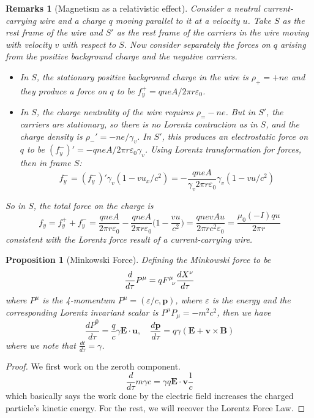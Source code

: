 \documentclass[a4paper]{article}
\newtheorem{remarks}{Remarks}[section]
\theoremstyle{new}
\newtheorem{prop}{Proposition}[section]
\begin{document}
\begin{remarks}[Magnetism as a relativistic effect]
Consider a neutral current-carrying wire and a charge $q$ moving parallel to it at a velocity $u$. Take $S$ as the rest frame of the wire and $S'$ as the rest frame of the carriers in the wire moving with velocity $v$ with respect to $S$. Now consider separately the forces on $q$ arising from the positive background charge and the negative carriers.
\begin{itemize}
    \item In $S$, the stationary positive background charge in the wire is $\rho_+=+ne$ and they produce a force on $q$ to be $f_y^+=qneA/2\pi r\varepsilon_0$.
    \item In $S$, the charge neutrality of the wire requires $\rho_=-ne$. But in $S'$, the carriers are stationary, so there is no Lorentz contraction as in $S$, and the charge density is $\rho_-'=-ne/\gamma_v$. In $S'$, this produces an electrostatic force on $q$ to be $(f_y^-)'=-qneA/2\pi r\varepsilon_0\gamma_v$. Using Lorentz transformation for forces, then in frame $S$:
    $$f_y^-=(f_y^-)'\gamma_v(1-vu_x/c^2)=-\frac{qneA}{\gamma_v2\pi r\varepsilon_0}\gamma_v(1-vu/c^2)$$
\end{itemize}
So in $S$, the total force on the charge is
$$f_y=f_y^++f_y^-=\frac{qneA}{2\pi r\varepsilon_0}-\frac{qneA}{2\pi r\varepsilon_0}\bigg(1-\frac{vu}{c^2}\bigg)=\frac{qnevAu}{2\pi rc^2\varepsilon_0}=\frac{\mu_0(-I)qu}{2\pi r}$$
consistent with the Lorentz force result of a current-carrying wire.
\end{remarks}
\begin{prop}[Minkowski Force]
Defining the Minkowski force to be
$$\frac{d}{d\tau}P^\mu=q\tensor*{F}{*_{}^{\mu}_{\nu}}\frac{dX^\nu}{d\tau}$$
where $P^\mu$ is the 4-momentum $P^\mu=(\varepsilon/c,\mathbf{p})$, where $\varepsilon$ is the energy and the corresponding Lorentz invariant scalar is $P^\mu P_\mu=-m^2c^2$, then we have
$$\frac{dP^0}{d\tau}=\frac{q}{c}\gamma\mathbf{E}\cdot\mathbf{u},\quad\frac{d\mathbf{p}}{d\tau}=q\gamma(\mathbf{E}+\mathbf{v}\times\mathbf{B})$$
where we note that $\frac{dt}{d\tau}=\gamma$.
\end{prop}
\begin{proof}
We first work on the zeroth component.
$$\frac{d}{d\tau}m\gamma c=\gamma q\mathbf{E}\cdot\mathbf{v}\frac{1}{c}$$
which basically says the work done by the electric field increases the charged particle's kinetic energy. For the rest, we will recover the Lorentz Force Law.
\end{proof}
\newpage
\end{document}
